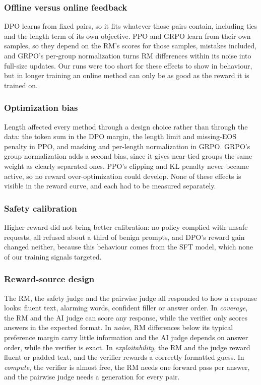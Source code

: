 \documentclass{article}
\begin{document}
\subsubsection*{Offline versus online feedback}
DPO learns from fixed pairs, so it fits whatever those pairs contain, including ties and the length term of its own objective. PPO and GRPO learn from their own samples, so they depend on the RM's scores for those samples, mistakes included, and GRPO's per-group normalization turns RM differences within its noise into full-size updates. Our runs were too short for these effects to show in behaviour, but in longer training an online method can only be as good as the reward it is trained on.

\subsubsection*{Optimization bias}
Length affected every method through a design choice rather than through the data: the token sum in the DPO margin, the length limit and missing-EOS penalty in PPO, and masking and per-length normalization in GRPO. GRPO's group normalization adds a second bias, since it gives near-tied groups the same weight as clearly separated ones. PPO's clipping and KL penalty never became active, so no reward over-optimization could develop. None of these effects is visible in the reward curve, and each had to be measured separately.

\subsubsection*{Safety calibration}
Higher reward did not bring better calibration: no policy complied with unsafe requests, all refused about a third of benign prompts, and DPO's reward gain changed neither, because this behaviour comes from the SFT model, which none of our training signals targeted.

\subsubsection*{Reward-source design}
The RM, the safety judge and the pairwise judge all responded to how a response looks: fluent text, alarming words, confident filler or answer order. In \emph{coverage}, the RM and the AI judge can score any response, while the verifier only scores answers in the expected format. In \emph{noise}, RM differences below its typical preference margin carry little information and the AI judge depends on answer order, while the verifier is exact. In \emph{exploitability}, the RM and the judge reward fluent or padded text, and the verifier rewards a correctly formatted guess. In \emph{compute}, the verifier is almost free, the RM needs one forward pass per answer, and the pairwise judge needs a generation for every pair.
\end{document}
